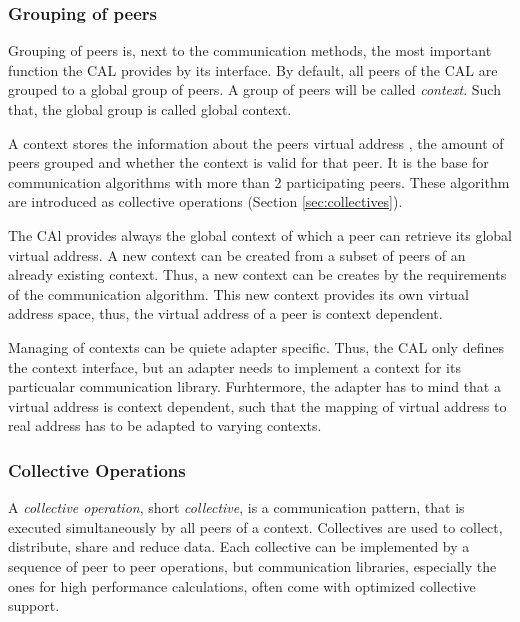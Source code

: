 \subsubsection{Grouping of peers}
\label{sec:cal_context}
Grouping of peers is, next to the communication methods, the most
important function the CAL provides by its interface.  By default, all
peers of the CAL are grouped to a global group of peers.  A group of
peers will be called \textit{context}. Such that, the global group is
called global context.

A context stores the information about the peers virtual address , the
amount of peers grouped and whether the context is valid for that
peer. It is the base for communication algorithms with more than 2
participating peers. These algorithm are introduced as collective
operations (Section \ref{sec:collectives}).

The CAl provides always the global context of which a peer
can retrieve its global virtual address. A new context can
be created from a subset of peers of an already existing
context. Thus, a new context can be creates by the
requirements of the communication algorithm. This new context
provides its own virtual address space, thus, the virtual
address of a peer is context dependent.

Managing of contexts can be quiete adapter specific. Thus, the CAL
only defines the context interface, but an adapter needs to implement
a context for its particualar communication library. Furhtermore, the
adapter has to mind that a virtual address is context dependent, such
that the mapping of virtual address to real address has to be adapted
to varying contexts.

\subsubsection{Collective Operations}
\label{sec:cal_collective}
A \textit{collective operation}, short \textit{collective}, is a
communication pattern, that is executed simultaneously by all peers of
a context. Collectives are used to collect, distribute, share and
reduce data.  Each collective can be implemented by a sequence of peer
to peer operations, but communication libraries, especially the ones for
high performance calculations, often come with optimized collective support.


